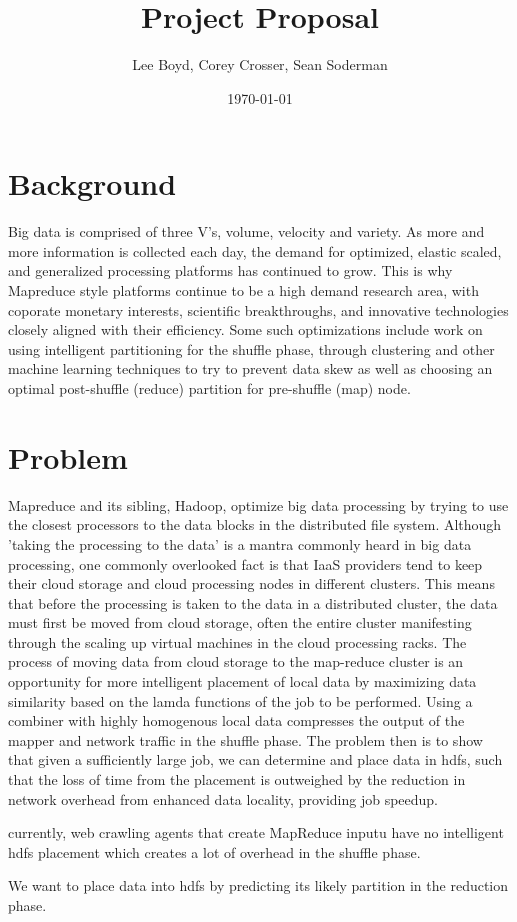 \documentclass[14pt]{extarticle}
\begin{document}
\title{Project Proposal}
\author{Lee Boyd,\n
        Corey Crosser,\n
        Sean Soderman}
\date{\today}
\maketitle

\section{Background}
Big data is comprised of three V's, volume, velocity and variety. As more and more information is collected each day, the demand for optimized, elastic scaled, and generalized processing platforms has continued to grow. This is why Mapreduce style platforms continue to be a high demand research area, with coporate monetary interests, scientific breakthroughs, and innovative technologies closely aligned with their efficiency.  Some such optimizations include work on using intelligent partitioning for the shuffle phase, through clustering and other machine learning techniques to try to prevent data skew as well as choosing an optimal post-shuffle (reduce) partition for pre-shuffle (map) node.  


\section{Problem}
Mapreduce and its sibling, Hadoop, optimize big data processing by trying to use the closest processors to the data blocks in the distributed file system.  Although 'taking the processing to the data' is a mantra commonly heard in big data processing, one commonly overlooked fact is that IaaS providers tend to keep their cloud storage and cloud processing nodes in different clusters.  This means that before the processing is taken to the data in a distributed cluster, the data must first be moved from cloud storage, often the entire cluster manifesting through the scaling up virtual machines in the cloud processing racks.  The process of moving data from cloud storage to the map-reduce cluster is an opportunity for more intelligent placement of local data by maximizing data similarity based on the lamda functions of the job to be performed.  Using a combiner with highly homogenous local data compresses the output of the mapper and network traffic in the shuffle phase.  The problem then is to show that given a sufficiently large job, we can determine and place data in hdfs, such that the loss of time from the placement is outweighed by the reduction in network overhead from enhanced data locality, providing job speedup.


currently, web crawling agents 
that create MapReduce inputu
have no intelligent hdfs placement which 
creates a lot of overhead in the shuffle
phase.



We want to place data into hdfs by predicting 
its likely partition in the reduction
phase.
\end{document}
